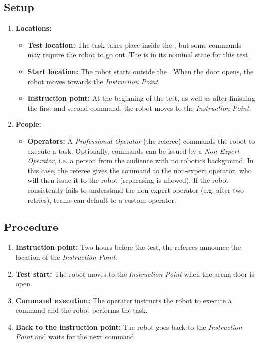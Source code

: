 \subsection*{Setup}
\begin{enumerate}
    \item \textbf{Locations:}
		\begin{itemize}
			\item \textbf{Test location:} The task takes place inside the \Arena{}, but some commands may require the robot to go out. The \Arena{} is in its nominal state for this test.
			\item \textbf{Start location:} The robot starts outside the \Arena{}. When the door opens, the robot moves towards the \textit{Instruction Point}.
			\item \textbf{Instruction point:} At the beginning of the test, as well as after finishing the first and second command, the robot moves to the \textit{Instruction Point}.
		\end{itemize}
	\item \textbf{People:}
		\begin{itemize}
			\item \textbf{Operators:} A \emph{Professional Operator} (the referee) commands the robot to execute a task.
            Optionally, commands can be issued by a \emph{Non-Expert Operator}, i.e. a person from the audience with no robotics background.
            In this case, the referee gives the command to the non-expert operator, who will then issue it to the robot (rephrasing is allowed).
            If the robot consistently fails to understand the non-expert operator (e.g. after two retries), teams can default to a custom operator.
		\end{itemize}
\end{enumerate}


\subsection*{Procedure}
\begin{enumerate}[nosep]
	\item \textbf{Instruction point:} Two hours before the test, the referees announce the location of the \textit{Instruction Point}.
	\item \textbf{Test start:} The robot moves to the \textit{Instruction Point} when the arena door is open.
	\item \textbf{Command execution:} The operator instructs the robot to execute a command and the robot performs the task.
	\item \textbf{Back to the instruction point:} The robot goes back to the \textit{Instruction Point} and waits for the next command.
\end{enumerate}


